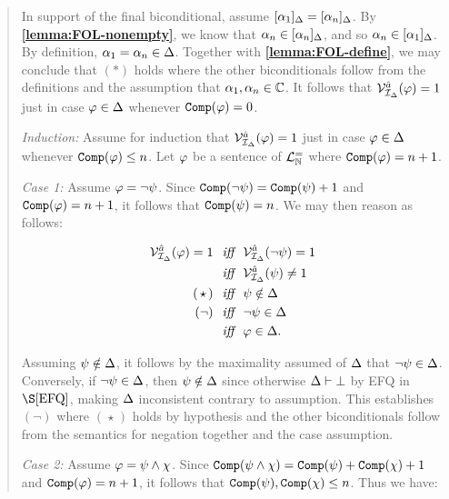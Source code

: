 \begin{quote}
  In support of the final biconditional, assume $[\alpha_1]_{\Delta}=[\alpha_n]_{\Delta}$.
  By \textbf{\ref{lemma:FOL-nonempty}}, we know that $\alpha_n\in[\alpha_n]_{\Delta}$, and so $\alpha_n\in[\alpha_1]_{\Delta}$.
  By definition, $\alpha_1=\alpha_n\in\Delta$.
  Together with \textbf{\ref{lemma:FOL-define}}, we may conclude that $(\ast)$ holds where the other biconditionals follow from the definitions and the assumption that $\alpha_1,\alpha_n\in\mathbb{C}$.
  It follows that $\mathcal{V}_{\mathcal{I}_{\Delta}}^{\hat{a}}(\varphi)=1$ just in case $\varphi\in\Delta$ whenever $\texttt{Comp}(\varphi)=0$.

  \textit{Induction:}
  Assume for induction that $\mathcal{V}_{\mathcal{I}_{\Delta}}^{\hat{a}}(\varphi)=1$ just in case $\varphi\in\Delta$ whenever $\texttt{Comp}(\varphi)\leq n$. 
  Let $\varphi$ be a sentence of $\mathcal{L}^{=}_{\mathbb{N}}$ where $\texttt{Comp}(\varphi)=n+1$.

  \textit{Case 1:}
  Assume $\varphi=\neg\psi$.
  Since $\texttt{Comp}(\neg\psi)=\texttt{Comp}(\psi)+1$ and $\texttt{Comp}(\varphi)=n+1$, it follows that $\texttt{Comp}(\psi)=n$.
  We may then reason as follows:

  \vspace{-.2in}
  \begin{align*}
    \mathcal{V}_{\mathcal{I}_{\Delta}}^{\hat{a}}(\varphi)=1 &\textit{ ~iff~ } \mathcal{V}_{\mathcal{I}_{\Delta}}^{\hat{a}}(\neg\psi)=1\\
      &\textit{ ~iff~ } \mathcal{V}_{\mathcal{I}_{\Delta}}^{\hat{a}}(\psi)\neq 1 \\
      (\hspace{1.6pt}\star\hspace{1.6pt}) &\textit{ ~iff~ } \psi\notin\Delta \\
      (\neg) &\textit{ ~iff~ } \neg\psi\in\Delta \\
      &\textit{ ~iff~ } \varphi\in\Delta.
  \end{align*}

  Assuming $\psi \notin \Delta$, it follows by the maximality assumed of $\Delta$ that $\neg\psi \in \Delta$. 
  Conversely, if $\neg\psi \in \Delta$, then $\psi \notin \Delta$ since otherwise $\Delta \vdash \bot$ by EFQ in $\S\ref{EFQ}$, making $\Delta$ inconsistent contrary to assumption.
  This establishes $(\neg)$ where $(\hspace{1pt}\star\hspace{1pt})$ holds by hypothesis and the other biconditionals follow from the semantics for negation together and the case assumption.

  \textit{Case 2:}
  Assume $\varphi=\psi\wedge\chi$.
  Since $\texttt{Comp}(\psi\wedge\chi)=\texttt{Comp}(\psi)+\texttt{Comp}(\chi)+1$ and  $\texttt{Comp}(\varphi)=n+1$, it follows that $\texttt{Comp}(\psi), \texttt{Comp}(\chi)\leq n$.
  Thus we have:


\end{quote}
